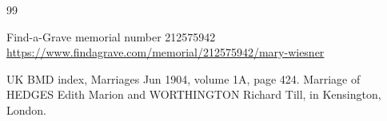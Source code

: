 \begin{thebibliography}{99}
\footnotesize

    Find-a-Grave memorial number 212575942
    \url{https://www.findagrave.com/memorial/212575942/mary-wiesner}

    UK BMD index, Marriages Jun 1904, volume 1A, page 424.
    Marriage of HEDGES Edith Marion and WORTHINGTON Richard Till,
    in Kensington, London.

\end{thebibliography}
